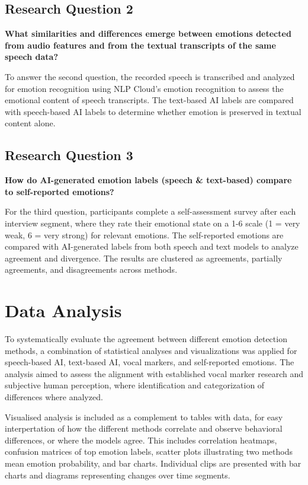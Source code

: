 \subsection{Research Question 2}
\textbf{What similarities and differences emerge between emotions detected from audio features and from the textual transcripts of the same speech data?}

To answer the second question, the recorded speech is transcribed and analyzed for emotion recognition using NLP Cloud’s emotion recognition to assess the emotional content of speech transcripts. The text-based AI labels are compared with speech-based AI labels to determine whether emotion is preserved in textual content alone. 

\subsection{Research Question 3}
\textbf{How do AI-generated emotion labels (speech \& text-based) compare to self-reported emotions? }

For the third question, participants complete a self-assessment survey after each interview segment, where they rate their emotional state on a 1-6 scale (1 = very weak, 6 = very strong) for relevant emotions. The self-reported emotions are compared with AI-generated labels from both speech and text models to analyze agreement and divergence. The results are clustered as agreements, partially agreements, and disagreements across methods. 


\section{Data Analysis}
\label{sec:method-data-analysis}
To systematically evaluate the agreement between different emotion detection methods, a combination of statistical analyses and visualizations was applied for speech-based AI, text-based AI, vocal markers, and self-reported emotions. 
The analysis aimed to assess the alignment with established vocal marker research and subjective human perception, where identification and categorization of differences where analyzed. 

Visualised analysis is included as a complement to tables with data, for easy interpertation of how the different methods correlate and observe behavioral differences, or where the models agree. 
This includes correlation heatmaps, confusion matrices of top emotion labels, scatter plots illustrating two methods mean emotion probability, and bar charts. 
Individual clips are presented with bar charts and diagrams representing changes over time segments. 



